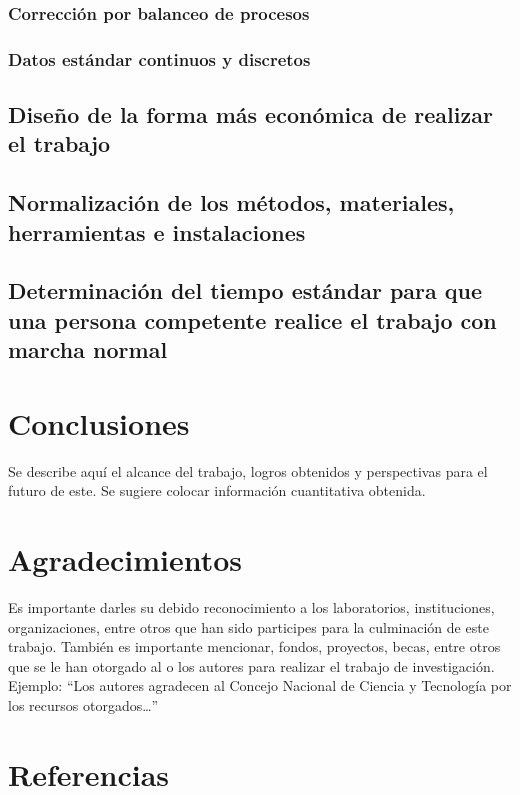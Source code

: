     \subsubsection{Corrección por balanceo de procesos}
    \subsubsection{Datos estándar continuos y discretos}
    \subsection{Diseño de la forma más económica de realizar el trabajo}
    
    \subsection{Normalización de los métodos, materiales, herramientas e instalaciones}
    
    \subsection{Determinación del tiempo estándar para que una persona competente realice el trabajo con marcha normal}
    
    
    
    \section{Conclusiones}
    
    Se describe aquí el alcance del trabajo, logros obtenidos y perspectivas para el futuro de este. Se sugiere colocar información cuantitativa obtenida.
    
    \section{Agradecimientos}
    
    Es importante darles su debido reconocimiento a los laboratorios, instituciones, organizaciones, entre otros que han sido participes para la culminación de este trabajo. También es importante mencionar, fondos, proyectos, becas, entre otros que se le han otorgado al o los autores para realizar el trabajo de investigación. Ejemplo: “Los autores agradecen al Concejo Nacional de Ciencia y Tecnología por los recursos otorgados…”
    
    \section*{Referencias}
    
